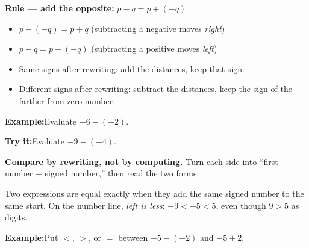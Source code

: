\documentclass[12pt]{article}
\begin{document}


\begin{formulabox}
\textbf{Rule --- add the opposite:} \quad $p - q = p + (-q)$
\begin{itemize}[leftmargin=0.8cm, itemsep=0pt, topsep=1pt]
  \item $p - (-q) = p + q$ \quad (subtracting a negative moves \emph{right})
  \item $p - q = p + (-q)$ \quad (subtracting a positive moves \emph{left})
  \item Same signs after rewriting: add the distances, keep that sign.
  \item Different signs after rewriting: subtract the distances, keep the sign of the farther-from-zero number.
\end{itemize}
\end{formulabox}

\begin{examplebox}
\textbf{Example:}\quad Evaluate $-6 - (-2)$.
\end{examplebox}

\begin{tryitbox}
\textbf{Try it:}\quad Evaluate $-9 - (-4)$.\\[2pt]
\end{tryitbox}


\begin{formulabox}
\textbf{Compare by rewriting, not by computing.} Turn each side into
``first number $+$ signed number,'' then read the two forms.\par
Two expressions are equal exactly when they add the same signed number to the same start.
On the number line, \emph{left is less}: $-9 < -5 < 5$, even though $9 > 5$ as digits.
\end{formulabox}

\begin{examplebox}
\textbf{Example:}\quad Put $<$, $>$, or $=$ between $-5 - (-2)$ and $-5 + 2$.
\end{examplebox}
\end{document}
